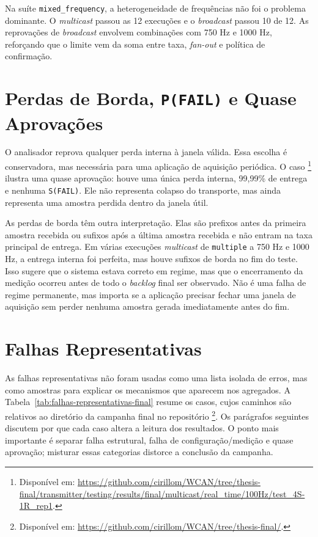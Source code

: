 Na suíte \texttt{mixed\_frequency}, a heterogeneidade de frequências não foi o
problema dominante. O \emph{multicast} passou as 12 execuções e o \emph{broadcast} passou 10
de 12. As reprovações de \emph{broadcast} envolvem combinações com 750 Hz e 1000 Hz,
reforçando que o limite vem da soma entre taxa, \emph{fan-out} e política de
confirmação.

\section{Perdas de Borda, \texttt{P(FAIL)} e Quase Aprovações}

O analisador reprova qualquer perda interna à janela válida. Essa escolha é
conservadora, mas necessária para uma aplicação de aquisição periódica. O caso
\footnote{Disponível em: \url{https://github.com/cirillom/WCAN/tree/thesis-final/transmitter/testing/results/final/multicast/real_time/100Hz/test_4S-1R_rep1}.} ilustra uma quase aprovação:
houve uma única perda interna, 99,99\% de entrega e nenhuma \texttt{S(FAIL)}.
Ele não representa colapso do transporte, mas ainda representa uma amostra
perdida dentro da janela útil.

As perdas de borda têm outra interpretação. Elas são prefixos antes da primeira
amostra recebida ou sufixos após a última amostra recebida e não entram na taxa
principal de entrega. Em várias execuções \emph{multicast} de \texttt{multiple} a 750 Hz
e 1000 Hz, a entrega interna foi perfeita, mas houve sufixos de borda no fim do
teste. Isso sugere que o sistema estava correto em regime, mas que o encerramento
da medição ocorreu antes de todo o \emph{backlog} final ser observado. Não é uma falha
de regime permanente, mas importa se a aplicação precisar fechar uma janela de
aquisição sem perder nenhuma amostra gerada imediatamente antes do fim.

\section{Falhas Representativas}

As falhas representativas não foram usadas como uma lista isolada de erros, mas
como amostras para explicar os mecanismos que aparecem nos agregados. A
Tabela~\ref{tab:falhas-representativas-final} resume os casos, cujos caminhos
são relativos ao diretório da campanha final no repositório
\footnote{Disponível em: \url{https://github.com/cirillom/WCAN/tree/thesis-final/}.}.
Os parágrafos seguintes discutem por que cada caso altera a leitura dos resultados.
O ponto mais importante é separar falha estrutural, falha de configuração/medição
e quase aprovação; misturar essas categorias distorce a conclusão da campanha.

